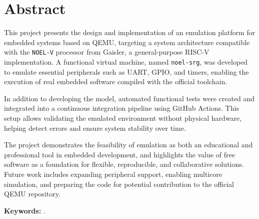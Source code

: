 %
%
%
% 
%
%
%
%

\chapter*{Abstract}
\label{cha:abstract}


This project presents the design and implementation of an emulation platform for embedded systems based on QEMU, targeting a system architecture compatible with the \texttt{NOEL-V} processor from Gaisler, a general-purpose RISC-V implementation. A functional virtual machine, named \texttt{noel-srg}, was developed to emulate essential peripherals such as UART, GPIO, and timers, enabling the execution of real embedded software compiled with the official toolchain.

In addition to developing the model, automated functional tests were created and integrated into a continuous integration pipeline using GitHub Actions. This setup allows validating the emulated environment without physical hardware, helping detect errors and ensure system stability over time.

The project demonstrates the feasibility of emulation as both an educational and professional tool in embedded development, and highlights the value of free software as a foundation for flexible, reproducible, and collaborative solutions. Future work includes expanding peripheral support, enabling multicore simulation, and preparing the code for potential contribution to the official QEMU repository.


\textbf{Keywords:} \myThesisKeywordsEnglish.



